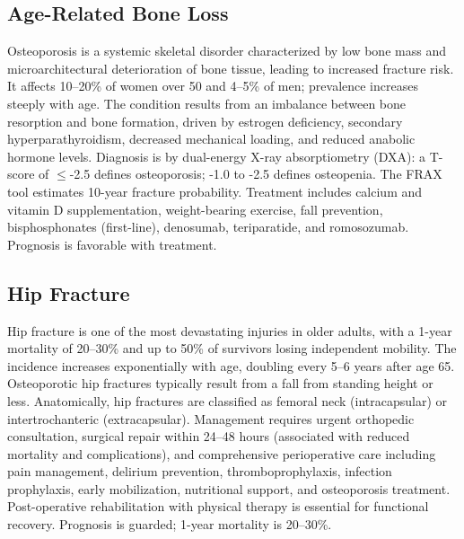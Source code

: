 \label{sec:Osteoporosis and Bone Health}

\subsection{Age-Related Bone Loss}
\label{sec:Age-Related Bone Loss}
Osteoporosis is a systemic skeletal disorder characterized by low bone mass and microarchitectural deterioration of bone tissue, leading to increased fracture risk. It affects 10--20\% of women over 50 and 4--5\% of men; prevalence increases steeply with age. The condition results from an imbalance between bone resorption and bone formation, driven by estrogen deficiency, secondary hyperparathyroidism, decreased mechanical loading, and reduced anabolic hormone levels. Diagnosis is by dual-energy X-ray absorptiometry (DXA): a T-score of $\leq$-2.5 defines osteoporosis; -1.0 to -2.5 defines osteopenia. The FRAX tool estimates 10-year fracture probability. Treatment includes calcium and vitamin D supplementation, weight-bearing exercise, fall prevention, bisphosphonates (first-line), denosumab, teriparatide, and romosozumab. Prognosis is favorable with treatment.

\subsection{Hip Fracture}
\label{sec:Hip Fracture}

Hip fracture is one of the most devastating injuries in older adults, with a 1-year mortality of 20--30\% and up to 50\% of survivors losing independent mobility. The incidence increases exponentially with age, doubling every 5--6 years after age 65. Osteoporotic hip fractures typically result from a fall from standing height or less. Anatomically, hip fractures are classified as femoral neck (intracapsular) or intertrochanteric (extracapsular). Management requires urgent orthopedic consultation, surgical repair within 24--48 hours (associated with reduced mortality and complications), and comprehensive perioperative care including pain management, delirium prevention, thromboprophylaxis, infection prophylaxis, early mobilization, nutritional support, and osteoporosis treatment. Post-operative rehabilitation with physical therapy is essential for functional recovery. Prognosis is guarded; 1-year mortality is 20--30\%.

